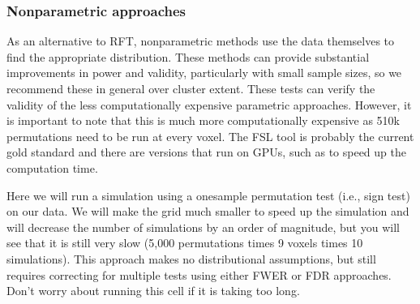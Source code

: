 \documentclass[letterpaper,10pt,english]{sphinxmanual}
\begin{document}
\subsubsection{Nonparametric approaches}
\label{\detokenize{content/Thresholding_Group_Analyses:nonparametric-approaches}}
As an alternative to RFT, nonparametric methods use the data themselves to find the appropriate distribution. These methods can provide substantial improvements in power and validity, particularly with small sample sizes, so we recommend these in general over cluster extent. These tests can verify the validity of the less computationally expensive parametric approaches. However, it is important to note that this is much more computationally expensive as 5\sphinxhyphen{}10k permutations need to be run at every voxel. The FSL tool  is probably the current gold standard and there are versions that run on GPUs, such as  to speed up the computation time.

Here we will run a simulation using a one\sphinxhyphen{}sample permutation test (i.e., sign test) on our data. We will make the grid much smaller to speed up the simulation and will decrease the number of simulations by an order of magnitude, but you will see that it is still very slow (5,000 permutations times 9 voxels times 10 simulations). This approach makes no distributional assumptions, but still requires correcting for multiple tests using either FWER or FDR approaches. Don’t worry about running this cell if it is taking too long.

\begin{sphinxVerbatim}[commandchars=\\\{\}]
  
  
  
     
   
  
 
  
\end{sphinxVerbatim}
\end{document}
